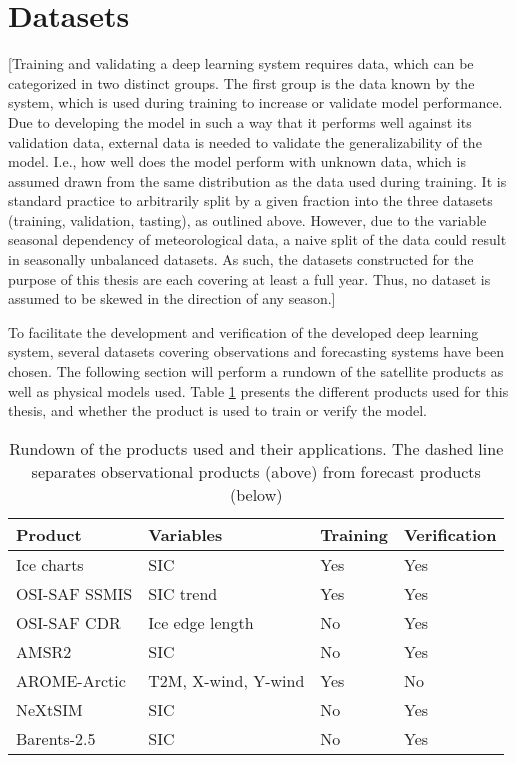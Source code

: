 \documentclass[../main/thesis.tex]{subfiles}
\begin{document}
\section{Datasets}
[Training and validating a deep learning system requires data, which can be categorized in two distinct groups. The first group is the data known by the system, which is used during training to increase or validate model performance. Due to developing the model in such a way that it performs well against its validation data, external data is needed to validate the generalizability of the model. I.e., how well does the model perform with unknown data, which is assumed drawn from the same distribution as the data used during training. It is standard practice to arbitrarily split by a given fraction into the three datasets (training, validation, tasting), as outlined above. However, due to the variable seasonal dependency of meteorological data, a naive split of the data could result in seasonally unbalanced datasets. As such, the datasets constructed for the purpose of this thesis are each covering at least a full year. Thus, no dataset is assumed to be skewed in the direction of any season.]  

To facilitate the development and verification of the developed deep learning system, several datasets covering observations and forecasting systems have been chosen. The following section will perform a rundown of the satellite products as well as physical models used. Table \ref{tab:data_overview} presents the different products used for this thesis, and whether the product is used to train or verify the model.

\begin{table}[]
    \caption{\label{tab:data_overview}Rundown of the products used and their applications. The dashed line separates observational products (above) from forecast products (below)}
    \centering
    \setlength{\arrayrulewidth}{0.5mm}
    \renewcommand{\arraystretch}{1.3}
    \begin{tabular}{llll}
    \hline
    Product             & Variables           & Training & Verification \\
    \hline
    Ice charts          & SIC                 & Yes      & Yes          \\
    OSI-SAF SSMIS       & SIC trend           & Yes      & Yes          \\
    OSI-SAF CDR         & Ice edge length     & No       & Yes          \\
    AMSR2               & SIC                 & No       & Yes          \\
    \hdashline
    AROME-Arctic        & T2M, X-wind, Y-wind & Yes      & No           \\
    NeXtSIM             & SIC                 & No       & Yes          \\
    Barents-2.5         & SIC                 & No       & Yes          \\
    \hline         
    \end{tabular}
\end{table}
\end{document}
